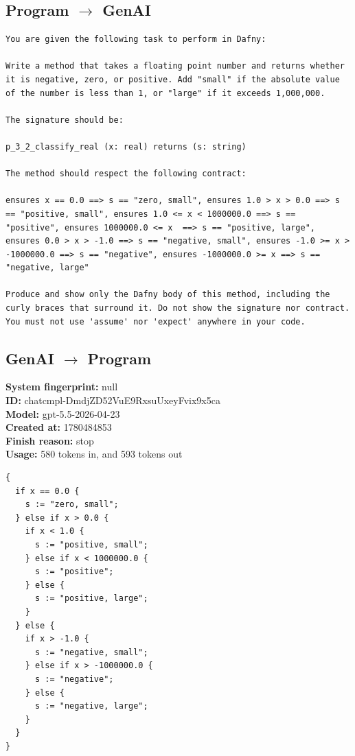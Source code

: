 \documentclass{article}
\begin{document}
\subsection*{Program $\rightarrow$ GenAI}
\begin{lstlisting}
You are given the following task to perform in Dafny:

Write a method that takes a floating point number and returns whether it is negative, zero, or positive. Add "small" if the absolute value of the number is less than 1, or "large" if it exceeds 1,000,000.

The signature should be:

p_3_2_classify_real (x: real) returns (s: string)

The method should respect the following contract:

ensures x == 0.0 ==> s == "zero, small", ensures 1.0 > x > 0.0 ==> s == "positive, small", ensures 1.0 <= x < 1000000.0 ==> s == "positive", ensures 1000000.0 <= x  ==> s == "positive, large", ensures 0.0 > x > -1.0 ==> s == "negative, small", ensures -1.0 >= x > -1000000.0 ==> s == "negative", ensures -1000000.0 >= x ==> s == "negative, large"

Produce and show only the Dafny body of this method, including the curly braces that surround it. Do not show the signature nor contract. You must not use 'assume' nor 'expect' anywhere in your code.
\end{lstlisting}
\subsection*{GenAI $\rightarrow$ Program}
\textbf{System fingerprint: }null
\\\textbf{ID: }chatcmpl-DmdjZD52VuE9RxsuUxeyFvix9x5ca
\\\textbf{Model: }gpt-5.5-2026-04-23
\\\textbf{Created at: }1780484853
\\\textbf{Finish reason: }stop
\\\textbf{Usage: }580 tokens in, and 593 tokens out
\begin{lstlisting}
{
  if x == 0.0 {
    s := "zero, small";
  } else if x > 0.0 {
    if x < 1.0 {
      s := "positive, small";
    } else if x < 1000000.0 {
      s := "positive";
    } else {
      s := "positive, large";
    }
  } else {
    if x > -1.0 {
      s := "negative, small";
    } else if x > -1000000.0 {
      s := "negative";
    } else {
      s := "negative, large";
    }
  }
}
\end{lstlisting}
\end{document}
